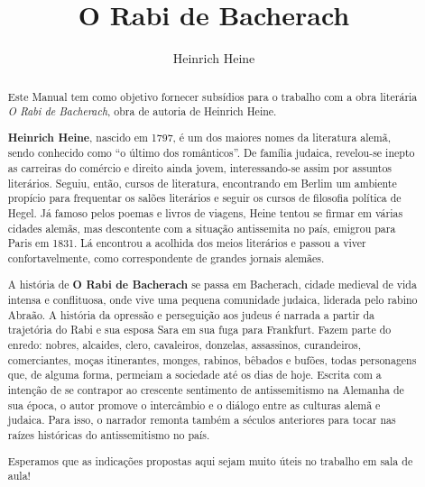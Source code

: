 \documentclass[12pt]{extarticle}
\begin{document}
\newcommand{\AutorLivro}{Heinrich Heine}
\newcommand{\TituloLivro}{O Rabi de Bacherach}
\newcommand{\Tema}{Ficção, mistério e fantasia}
\newcommand{\Genero}{Romance}
\newcommand{\imagemCapa}{./images/PNLD0018-01.png}
\newcommand{\issnppub}{---}
\newcommand{\issnepub}{---}
\newcommand{\colaborador}{\textbf{Michelle Etienne Florence, Bruno Gradella e Vicente Castro} é uma pessoa incrível e vai fazer um bom serviço.}


\title{\TituloLivro}
\author{\AutorLivro}
\def\authornotes{\colaborador}

\date{}
\maketitle

\baselineskip\par

\begin{abstract}

Este Manual tem como objetivo fornecer subsídios para o trabalho com a
obra literária \emph{O Rabi de Bacherach}, obra de autoria de Heinrich
Heine.

\textbf{Heinrich Heine}, nascido em 1797, é um dos maiores nomes da literatura alemã,
sendo conhecido como ``o último dos românticos''.
De família judaica, revelou-se inepto as carreiras do comércio e direito ainda 
jovem, interessando-se assim por assuntos literários. Seguiu, então, cursos de 
literatura, encontrando em Berlim um ambiente propício para frequentar os salões 
literários e seguir os cursos de filosofia política de Hegel.
Já famoso pelos poemas e livros de viagens, Heine tentou se firmar em várias
cidades alemãs, mas descontente com a situação antissemita no país, emigrou
para Paris em 1831. Lá encontrou a acolhida dos meios literários e passou a
viver confortavelmente, como correspondente de grandes jornais alemães.

A história de \textbf{O Rabi de Bacherach} se passa em Bacherach, cidade medieval 
de vida intensa e conflituosa, onde vive uma pequena comunidade judaica, liderada pelo
rabino Abraão. A história da opressão e perseguição aos judeus é narrada a
partir da trajetória do Rabi e sua esposa Sara em sua fuga para Frankfurt.
Fazem parte do enredo: nobres, alcaides, clero, cavaleiros, donzelas, assassinos, 
curandeiros, comerciantes, moças itinerantes, monges, rabinos, bêbados e bufões, 
todas personagens que, de alguma forma, permeiam a sociedade até os dias de hoje.
Escrita com a intenção de se contrapor ao crescente sentimento de antissemitismo
na Alemanha de sua época, o autor promove o intercâmbio e o diálogo entre as culturas 
alemã e judaica. Para isso, o narrador remonta também a séculos anteriores para tocar 
nas raízes históricas do antissemitismo no país.

Esperamos que as indicações propostas aqui sejam muito úteis no trabalho em
sala de aula! 



\end{abstract}
\end{document}
